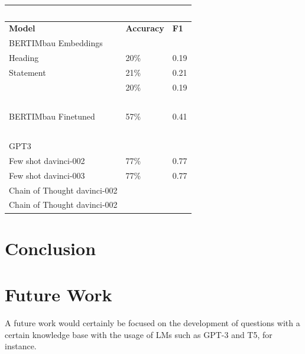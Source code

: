 \documentclass{article}
\begin{document}

\begin{center}
\begin{tabular}{ | l | l | l | }
\hline
	\  & \  & \  \\ \hline
	\textbf{Model} & \textbf{Accuracy} & \textbf{F1} \\ \hline
	  BERTIMbau Embeddings & \  & \  \\ \hline
	     Heading & 20\% & 0.19 \\ \hline
	     Statement & 21\% & 0.21 \\ \hline
	     [CLS] & 20\% & 0.19 \\ \hline
	\  & \  & \  \\ \hline
	  BERTIMbau Finetuned & 57\% & 0.41 \\ \hline
	\  & \  & \  \\ \hline
	  GPT3 & \  & \  \\ \hline
	    Few shot  davinci-002 & 77\% & 0.77 \\ \hline
	    Few shot  davinci-003 & 77\% & 0.77 \\ \hline
	    Chain of Thought  davinci-002 & \  & \  \\ \hline
	    Chain of Thought  davinci-002 &  &  \\ \hline
\end{tabular}
\end{center}

\section{Conclusion}


\section{Future Work}

A future work would certainly be focused on the development of questions with a certain knowledge base with the usage of LMs such as GPT-3 and T5, for instance.



\end{document}
